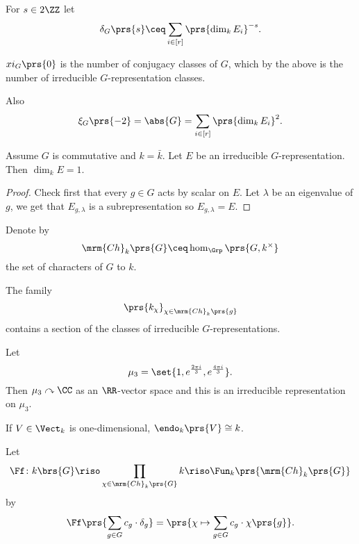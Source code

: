 \documentclass[10pt,a4paper,twoside,openany,hidelinks]{book}
\begin{document}
\begin{definition}
For $s \in 2\ZZ$ let \[\delta_G\prs{s} \ceq \sum_{i \in [r]} \prs{\dim_k E_i}^{-s} \text{.}\]
\end{definition}

\begin{corollary}
$xi_G\prs{0}$ is the number of conjugacy classes of $G$, which by the above is the number of irreducible $G$-representation classes.

Also \[\xi_G\prs{-2} = \abs{G} = \sum_{i \in [r]} \prs{\dim_k E_i}^2 \text{.}\]
\end{corollary}

\begin{lemma}
Assume $G$ is commutative and $k = \bar{k}$. Let $E$ be an irreducible $G$-representation. Then $\dim_k E = 1$.
\end{lemma}

\begin{proof}
Check first that every $g \in G$ acts by scalar on $E$. Let $\lambda$ be an eigenvalue of $g$, we get that $E_{g,\lambda}$ is a subrepresentation so $E_{g,\lambda} = E$.
\end{proof}

\begin{notation}
Denote by \[\mrm{Ch}_k\prs{G} \ceq \hom_{\Grp}\prs{G, k^\times}\]
the set of characters of $G$ to $k$.
\end{notation}

\begin{corollary}
The family
\[\prs{k_\chi}_{\chi \in \mrm{Ch}_k\prs{g}}\]
contains a section of the classes of irreducible $G$-representations.
\end{corollary}

\begin{remark}
Let \[\mu_3 = \set{1, e^{\frac{2 \pi i}{3}}, e^{\frac{4 \pi i}{3}}} \text{.}\]
Then $\mu_3 \acts \CC$ as an $\RR$-vector space and this is an irreducible representation on $\mu_3$.
\end{remark}

\begin{fact}
If $V \in \Vect_k$ is one-dimensional, $\endo_k\prs{V} \cong k$.
\end{fact}

\begin{definition}
Let 
\[\Ff \colon k\brs{G} \riso \prod_{\chi \in \mrm{Ch}_k\prs{G}} k \riso \Fun_k\prs{\mrm{Ch}_k\prs{G}}\]
by
\[\Ff\prs{\sum_{g \in G} c_g \cdot \delta_g} = \prs{\chi \mapsto \sum_{g \in G} c_g \cdot \chi\prs{g}} \text{.}\]
\end{definition}
\end{document}
